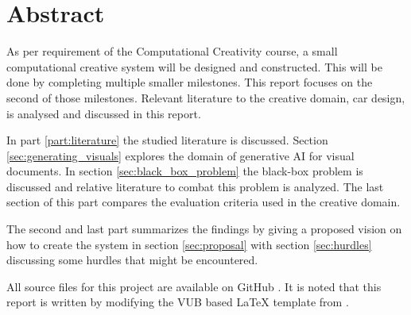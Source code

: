 \chapter*{Abstract}
As per requirement of the Computational Creativity course, a small computational creative system will be designed and constructed.
This will be done by completing multiple smaller milestones.
This report focuses on the second of those milestones.
Relevant literature to the creative domain, car design, is analysed and discussed in this report.

In part \ref{part:literature} the studied literature is discussed. Section \ref{sec:generating_visuals} explores the domain of generative AI for visual documents. In section \ref{sec:black_box_problem} the black-box problem is discussed and relative literature to combat this problem is analyzed. The last section of this part compares the evaluation criteria used in the creative domain.

The second and last part summarizes the findings by giving a proposed vision on how to create the system in section \ref{sec:proposal} with section \ref{sec:hurdles} discussing some hurdles that might be encountered. 

All source files for this project are available on GitHub \citep{github_project}. It is noted that this report is written by modifying the VUB based \LaTeX{} template from \citet{latex_template}. 